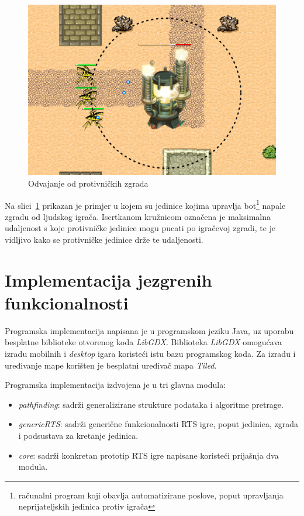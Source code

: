\documentclass[times, utf8, zavrsni, numeric]{fer}
\begin{document}
\begin{figure}[h]
	\centering
	\includegraphics[width=0.8\linewidth]{images/boidsEnemySeparation.pdf}
	\caption{Odvajanje od protivničkih zgrada}
	\label{fig:boidsEnemySeparation}
\end{figure}

\par Na slici~\ref{fig:boidsEnemySeparation} prikazan je primjer u kojem su jedinice kojima upravlja bot\footnote{računalni program koji obavlja automatizirane poslove, poput upravljanja neprijateljskih jedinica protiv igrača} napale zgradu od ljudskog igrača.
Iscrtkanom kružnicom označena je maksimalna udaljenost s koje protivničke jedinice mogu pucati po igračevoj zgradi, te je vidljivo kako se protivničke jedinice drže te udaljenosti.

\chapter{Implementacija jezgrenih funkcionalnosti}\label{ch:implementation}

\par Programska implementacija napisana je u programskom jeziku Java, uz uporabu besplatne biblioteke otvorenog koda \textit{LibGDX}.
Biblioteka \textit{LibGDX} omogućava izradu mobilnih i \textit{desktop} igara koristeći istu bazu programskog koda. 
Za izradu i uređivanje mape korišten je besplatni uređivač mapa \textit{Tiled}.

\par Programska implementacija izdvojena je u tri glavna modula:
\begin{itemize}
	\item \textit{pathfinding}: sadrži generalizirane strukture podataka i algoritme pretrage.
	\item \textit{genericRTS}: sadrži generične funkcionalnosti RTS igre, poput jedinica, zgrada i podsustava za kretanje jedinica.
	\item \textit{core}: sadrži konkretan prototip RTS igre napisane koristeći prijašnja dva modula.
\end{itemize}
\end{document}
